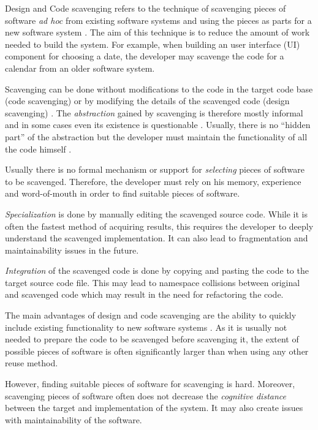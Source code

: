 Design and Code scavenging refers to the technique of scavenging pieces of software \emph{ad hoc} from existing software systems and using the pieces as parts for a new software system  \citep[chap.~4]{krueger_software_1992}. The aim of this technique is to reduce the amount of work needed to build the system. For example, when building an user interface (UI) component for choosing a date, the developer may scavenge the code for a calendar from an older software system.

Scavenging can be done without modifications to the code in the target code base (code scavenging) or by modifying the details of the scavenged code (design scavenging) \citep[chap.~4]{krueger_software_1992}. The \emph{abstraction} gained by scavenging is therefore mostly informal and in some cases even its existence is questionable \citep[chap.~3]{sametinger_software_1997}. Usually, there is no ``hidden part'' of the abstraction but the developer must maintain the functionality of all the code himself \citep[chap.~3]{sametinger_software_1997}.

Usually there is no formal mechanism or support for \emph{selecting} pieces of software to be scavenged. Therefore, the developer must rely on his memory, experience and word-of-mouth in order to find suitable pieces of software. \citep[chap.~3]{sametinger_software_1997}

\emph{Specialization} is done by manually editing the scavenged source code. While it is often the fastest method of acquiring results, this requires the developer to deeply understand the scavenged implementation. It can also lead to fragmentation and maintainability issues in the future. \citep[chap.~4]{krueger_software_1992}

\emph{Integration} of the scavenged code is done by copying and pasting the code to the target source code file. This may lead to namespace collisions between original and scavenged code which may result in the need for refactoring the code. \citep[chap.~4]{krueger_software_1992}

The main advantages of design and code scavenging are the ability to quickly include existing functionality to new software systems \citep[chap.~4]{krueger_software_1992}. As it is usually not needed to prepare the code to be scavenged before scavenging it, the extent of possible pieces of software is often significantly larger than when using any other reuse method. 

However, finding suitable pieces of software for scavenging is hard. Moreover, scavenging pieces of software often does not decrease the \emph{cognitive distance} between the target and implementation of the system. It may also create issues with maintainability of the software. \citep[chap.~4]{krueger_software_1992}

